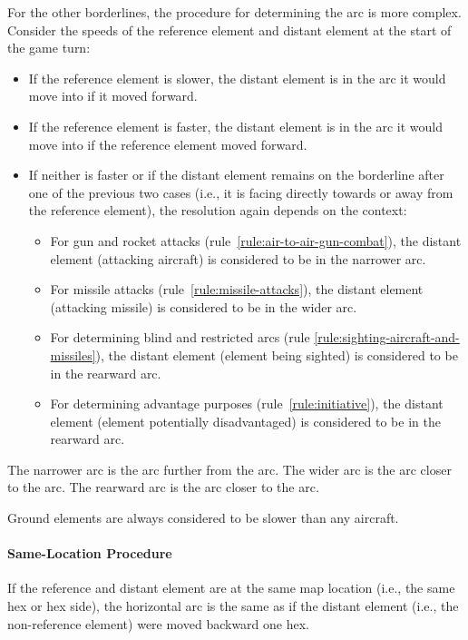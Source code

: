 {For the other borderlines, the procedure for determining the arc is more complex. Consider the speeds of the reference element and distant element at the start of the game turn:
\begin{itemize}
\item If the reference element is slower, the distant element is in the arc it would move into if it moved forward.
\item If the reference element is faster, the distant element is in the arc it would move into if the reference element moved forward.
\item If neither is faster or if the distant element remains on the borderline after one of the previous two cases (i.e., it is facing directly towards or away from the reference element), the resolution again depends on the context:
\begin{itemize}
\item For gun and rocket attacks (rule~\ref{rule:air-to-air-gun-combat}), the distant element (attacking aircraft) is considered to be in the narrower arc.
\item For missile attacks (rule~\ref{rule:missile-attacks}), the distant element (attacking missile) is considered to be in the wider arc.
\item For determining blind and restricted arcs (rule \ref{rule:sighting-aircraft-and-missiles}), the distant element (element being sighted) is considered to be in the rearward arc.
\item For determining advantage purposes (rule~\ref{rule:initiative}), the distant element (element potentially disadvantaged) is considered to be in the rearward arc.
\end{itemize}
\end{itemize}

The narrower arc is the arc further from the  arc. The wider arc is the arc closer to the  arc. The rearward arc is the arc closer to the  arc.

Ground elements are always considered to be slower than any aircraft.

\paragraph{Same-Location Procedure}
If the reference and distant element are at the same map location (i.e., the same hex or hex side), the horizontal arc is the same as if the distant element (i.e., the non-reference element) were moved backward one hex.

}
